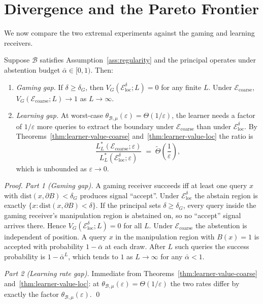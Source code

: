 \documentclass[runningheads,envcountsame]{llncs}
\newcommand{\cB}{\mathcal{B}}
\newcommand{\cE}{\mathcal{E}}
\newcommand{\eps}{\varepsilon}
\newcommand{\dis}{\theta}
\begin{document}
\section{Divergence and the Pareto Frontier}
\label{sec:divergence}

We now compare the two extremal experiments against the gaming and learning receivers.

\begin{theorem}
\label{thm:divergence}
Suppose $\cB$ satisfies Assumption~\ref{ass:regularity} and the principal operates under abstention budget $\bar\alpha \in [0,1)$. Then:
\begin{enumerate}[nosep]
\item \emph{Gaming gap.} If $\delta \geq \delta_G$, then $V_G(\cE_{\mathrm{loc}}^\delta; L) = 0$ for any finite $L$. Under $\cE_{\mathrm{coarse}}$, $V_G(\cE_{\mathrm{coarse}}; L) \to 1$ as $L \to \infty$.
\item \emph{Learning gap.} At worst-case $\dis_{\cB,\mu}(\eps) = \Theta(1/\eps)$, the learner needs a factor of $1/\eps$ more queries to extract the boundary under $\cE_{\mathrm{coarse}}$ than under $\cE_{\mathrm{loc}}^\delta$. By Theorems~\ref{thm:learner-value-coarse} and~\ref{thm:learner-value-loc} the ratio is
\[
\frac{L^*_L(\cE_{\mathrm{coarse}}; \eps)}{L^*_L(\cE_{\mathrm{loc}}^\delta; \eps)} \;=\; \tilde\Theta\!\left(\frac{1}{\eps}\right),
\]
which is unbounded as $\eps \to 0$.
\end{enumerate}
\end{theorem}

\begin{proof}
\emph{Part 1 (Gaming gap).} A gaming receiver succeeds iff at least one query $x$ with $\mathrm{dist}(x, \partial B) < \delta_G$ produces signal ``accept''. Under $\cE_{\mathrm{loc}}^\delta$ the abstain region is exactly $\{x : \mathrm{dist}(x, \partial B) < \delta\}$. If the principal sets $\delta \geq \delta_G$, every query inside the gaming receiver's manipulation region is abstained on, so no ``accept'' signal arrives there. Hence $V_G(\cE_{\mathrm{loc}}^\delta; L) = 0$ for all $L$. Under $\cE_{\mathrm{coarse}}$ the abstention is independent of position. A query $x$ in the manipulation region with $B(x) = 1$ is accepted with probability $1 - \bar\alpha$ at each draw. After $L$ such queries the success probability is $1 - \bar\alpha^L$, which tends to $1$ as $L \to \infty$ for any $\bar\alpha < 1$.

\emph{Part 2 (Learning rate gap).} Immediate from Theorems~\ref{thm:learner-value-coarse} and~\ref{thm:learner-value-loc}: at $\dis_{\cB,\mu}(\eps) = \Theta(1/\eps)$ the two rates differ by exactly the factor $\dis_{\cB,\mu}(\eps)$. \qed
\end{proof}
\end{document}
